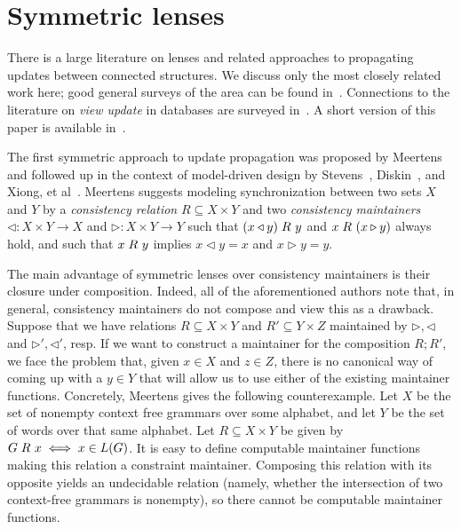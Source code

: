 \section{Symmetric lenses}
\newif \iftext  \texttrue
\newif \iffull  \fulltrue
\newif \ifdraft \draftfalse
\newif \ifdelta \deltafalse
\newif \iflater \laterfalse  %

\newif \iftikz  \tikztrue
There is a large literature on lenses and related approaches to
propagating updates between connected structures.  We discuss only the most
closely related work here; good general surveys of the area can be found
in~\cite{FosterThesis,DBLP:conf/icmt/CzarneckiFHLST09}.  Connections to the
literature on {\em view update} in databases are surveyed
in~\cite{Focal2005-shortcite}. \iffull A short version of this paper is available
in~\cite{HofmannPierceWagner10}.\fi

The first symmetric approach to update propagation was proposed by
Meertens~\cite{Meertens98} and followed up \iffull in the context of
model-driven design \fi by Stevens~\cite{Stevens07},
Diskin~\cite{DBLP:conf/models/Diskin08}, and Xiong, et
al~\cite{xiong2009supporting}.
%
Meertens suggests modeling synchronization between two sets
$X$ and $Y$ by a {\em consistency relation} $R\subseteq
X\times Y$ and two {\em consistency maintainers}
$\triangleleft: X\times Y\rightarrow X$ and $\triangleright: X\times Y
\rightarrow Y$ such that $(x\triangleleft y) \mathrel{R_{}} y$ and
$x \mathrel{R_{}} (x\triangleright y)$ always hold, and such that $x \mathrel{R_{}} y$ implies
$x \triangleleft y = x$ and $x \triangleright y = y$.

The main advantage of symmetric lenses over consistency maintainers is
their closure under composition. Indeed, all of the aforementioned
authors note that, in general, consistency maintainers do not compose
and view this as a drawback.
%
Suppose that we have relations $R\subseteq X\times Y$ and
$R'\subseteq Y\times Z$ maintained by $\triangleright,\triangleleft$
and $\triangleright', \triangleleft'$, resp. If we want to construct a
maintainer for the composition $R;R'$, we face the problem that, given
$x\in X$ and $z\in Z$, there is no canonical way of coming up with a
$y\in Y$ that will allow us to use either of the existing maintainer
functions. Concretely, Meertens gives the following counterexample.
Let $X$ be the set of nonempty context free grammars over some alphabet, and let
$Y$ be the set of words over that same alphabet. Let $R\subseteq
X\times Y$ be given by $G \mathrel{R_{}} x\iff x\in L(G)$. It is easy to define
computable maintainer functions making this relation a constraint
maintainer. Composing this relation with its opposite yields an 
undecidable relation (namely, whether the intersection of two context-free
grammars is nonempty), so there cannot be computable maintainer functions.

